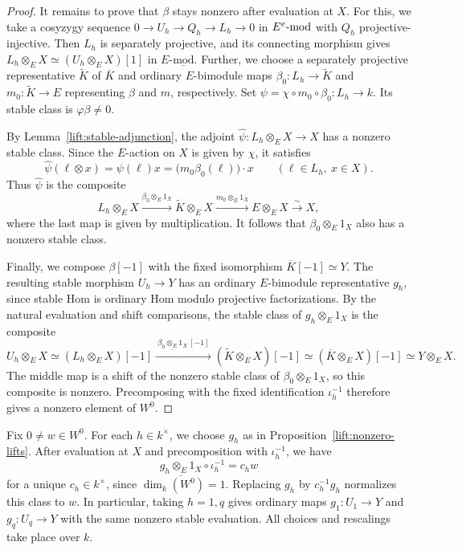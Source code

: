 \documentclass[11pt]{article}
\begin{document}
\begin{proof}
It remains to prove that $\beta$ stays nonzero after evaluation at $X$.
For this, we take a cosyzygy sequence
$0\to U_h\to Q_h\to L_h\to0$ in $E^e\mbox{{\rm -mod}}$ with $Q_h$ projective-injective. Then $L_h$ is separately
projective, and its connecting morphism gives
$L_h\otimes_EX\simeq(U_h\otimes_EX)[1]$ in
$E\text{-}\underline{\mathrm{mod}}$.
Further, we choose a separately projective representative $\widetilde K$ of $\overline K$ and ordinary
$E$-bimodule maps $\beta_0:L_h\to \widetilde K$ and $m_0:\widetilde K\to E$ representing
$\beta$ and $m$, respectively. Set $\psi=\chi\circ m_0\circ\beta_0:L_h\to k$.
Its stable class is $\varphi\beta\ne0$.

By Lemma~\ref{lift:stable-adjunction}, the adjoint
$\widehat\psi:L_h\otimes_E X\to X$ has a nonzero stable class.
Since the $E$-action on $X$ is given by $\chi$, it satisfies
\[
 \widehat\psi(\ell\otimes x)=\psi(\ell)x
 =\big(m_0\beta_0(\ell)\big)\cdot x
 \qquad(\ell\in L_h,\ x\in X).
\]
Thus $\widehat\psi$ is the composite
\[
 L_h\otimes_E X
 \xrightarrow{\beta_0\otimes_E1_X}\widetilde K\otimes_E X
 \xrightarrow{m_0\otimes_E1_X}E\otimes_E X
 \xrightarrow{\sim}X,
\]
where the last map is given by multiplication.
It follows that $\beta_0\otimes_E1_X$ also has a nonzero stable class.

Finally, we compose $\beta[-1]$ with the fixed isomorphism $\overline K[-1]\simeq Y$.
The resulting stable morphism $U_h\to Y$ has an ordinary $E$-bimodule representative $g_h$, since stable Hom is ordinary Hom modulo projective factorizations. By the natural evaluation and shift
comparisons, the stable class of $g_h\otimes_E1_X$ is the composite
\[
 U_h\otimes_E X\simeq(L_h\otimes_E X)[-1]
 \xrightarrow{\ \underline{\beta_0\otimes_E1_X}\,[-1]\ }
 (\widetilde K\otimes_E X)[-1]\simeq (\overline K\otimes_E X)[-1]\simeq Y\otimes_E X.
\]
The middle map is a shift of the nonzero stable class of
$\beta_0\otimes_E1_X$, so this composite is nonzero.
Precomposing with the fixed identification $\iota_h^{-1}$ therefore gives a nonzero element of $W^0$.
\end{proof}

Fix $0\ne w\in W^0$.  For each $h\in k^\times$, we choose $g_h$ as
in Proposition~\ref{lift:nonzero-lifts}. After evaluation at $X$ and
precomposition with $\iota_h^{-1}$, we have
\[
 \underline{g_h\otimes_E1_X}\circ\iota_h^{-1}=c_hw
\]
for a unique $c_h\in k^\times$, since $\dim_k(W^0)=1$.
Replacing $g_h$ by $c_h^{-1}g_h$ normalizes this class to $w$.
In particular, taking $h=1,q$ gives ordinary maps
$g_1:U_1\to Y$ and $g_q:U_q\to Y$ with the same nonzero stable evaluation. All choices and rescalings
take place over $k$.
\end{document}
